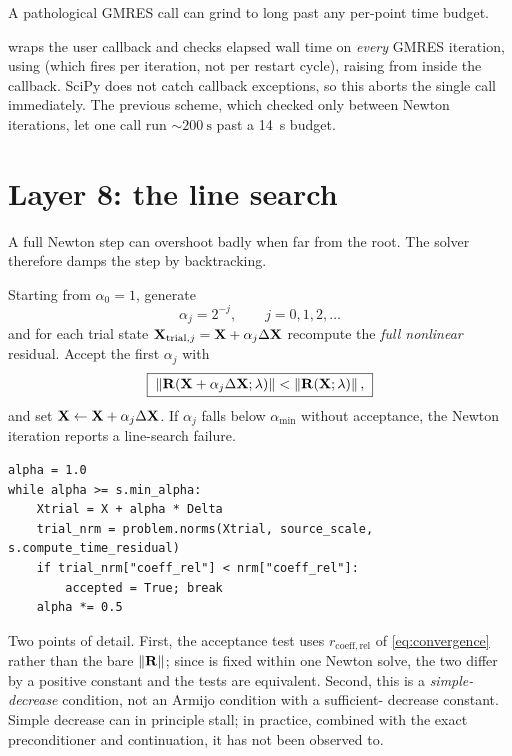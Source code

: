 A pathological GMRES call can grind to  long past any per-point
time budget.

\begin{implnote}
 wraps the user callback and checks elapsed wall time on
\emph{every} GMRES iteration, using  (which
fires per iteration, not per restart cycle), raising
 from inside the callback. SciPy does not catch
callback exceptions, so this aborts the single call immediately. The previous
scheme, which checked only between Newton iterations, let one call run
$\sim\SI{200}{\second}$ past a \SI{14}{\second} budget.
\end{implnote}

\section{Layer 8: the line search}
\label{sec:line-search}

A full Newton step can overshoot badly when far from the root. The solver
therefore damps the step by backtracking.

Starting from $\alpha_0=1$, generate
\begin{equation}
  \boxed{\;\alpha_j = 2^{-j},\qquad j=0,1,2,\dots\;}
\end{equation}
and for each trial state $\mathbf{X}_{\mathrm{trial},j} = \mathbf{X} + \alpha_j\Delta\mathbf{X}$
recompute the \emph{full nonlinear} residual. Accept the first $\alpha_j$ with
\begin{equation}
  \boxed{\;
  \left\|\mathbf{R}(\mathbf{X} + \alpha_j\Delta\mathbf{X};\lambda)\right\|
  <
  \left\|\mathbf{R}(\mathbf{X};\lambda)\right\| ,
  \;}
  \label{eq:armijo}
\end{equation}
and set $\mathbf{X} \leftarrow \mathbf{X} + \alpha_j\Delta\mathbf{X}$. If $\alpha_j$ falls
below $\alpha_{\min}$ without acceptance, the Newton iteration reports a
line-search failure.

\begin{implnote}
\begin{lstlisting}
alpha = 1.0
while alpha >= s.min_alpha:
    Xtrial = X + alpha * Delta
    trial_nrm = problem.norms(Xtrial, source_scale, s.compute_time_residual)
    if trial_nrm["coeff_rel"] < nrm["coeff_rel"]:
        accepted = True; break
    alpha *= 0.5
\end{lstlisting}
Two points of detail. First, the acceptance test uses
$r_{\mathrm{coeff,rel}}$ of \eqref{eq:convergence} rather than the bare
$\|\mathbf{R}\|$; since  is fixed within one Newton solve, the
two differ by a positive constant and the tests are equivalent. Second, this is
a \emph{simple-decrease} condition, not an Armijo condition with a sufficient-
decrease constant. Simple decrease can in principle stall; in practice, combined
with the exact preconditioner and continuation, it has not been observed to.
\end{implnote}

